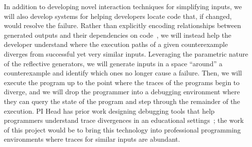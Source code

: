 


In addition to developing novel interaction techniques for simplifying inputs,
we will also develop systems for helping developers locate code that, if
changed, would resolve the failure. Rather than explicitly encoding
relationships between generated outputs and their dependencies on
code~\cite{ref:ko2009finding}, we will instead help the developer
understand where the execution paths of a given counterexample diverges from
successful yet very similar inputs. Leveraging the parametric nature of the
reflective generators, we will generate inputs in a space ``around'' a
counterexample and identify which ones no longer cause a failure.  Then, we will
execute the program up to the point where the traces of the programs begin to
diverge, and we will drop the programmer into a debugging environment where
they can query the state of the program and step through the remainder of the
execution. PI Head has prior work designing debugging tools that help
programmers understand trace divergences in an educational
settings~\cite{ref:suzuki2017tracediff}; the work of this project would be to
bring this technology into professional programming environments where traces
for similar inputs are abundant.

%
\iflater {}\fi


